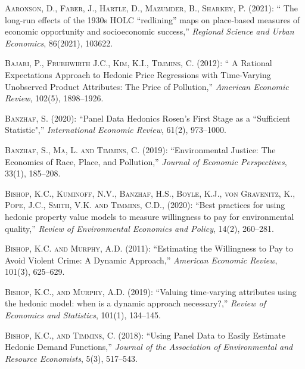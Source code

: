 \documentclass[ecta,nameyear,draft]{econsocart}
\theoremstyle{plain}
\theoremstyle{remark}
\begin{document}
\begin{thebibliography}{}

\textsc{Aaronson, D., Faber, J., Hartle, D., Mazumder, B., Sharkey, P.} (2021):
`` The long-run effects of the 1930s HOLC “redlining” maps on place-based
measures of economic opportunity and socioeconomic success,''
\textit{Regional Science and Urban Economics}, 86(2021), 103622.
\endbibitem

\textsc{Bajari, P., Fruehwirth J.C., Kim, K.I., Timmins, C.} (2012):
`` A Rational Expectations Approach to Hedonic Price Regressions with Time-Varying Unobserved Product Attributes: The Price of Pollution,''
\textit{American Economic Review}, 102(5), 1898--1926.
\endbibitem

\textsc{Banzhaf, S.} (2020):
``Panel Data Hedonics Rosen’s First Stage as a “Sufficient
Statistic",''
\textit{International Economic Review}, 61(2), 973--1000.
\endbibitem


\textsc{Banzhaf, S., Ma, L. and Timmins, C.} (2019):
``Environmental Justice: The Economics of Race, Place, and Pollution,''
\textit{Journal of Economic Perspectives}, 33(1), 185--208.
\endbibitem

\textsc{Bishop, K.C., Kuminoff, N.V., Banzhaf, H.S., Boyle, K.J., von Gravenitz, K., Pope, J.C., Smith, V.K. and Timmins, C.D., } (2020):
``Best practices for using hedonic property value models to measure willingness to pay for environmental quality,''
\textit{Review of Environmental Economics and Policy}, 14(2), 260--281.
\endbibitem

\textsc{Bishop, K.C. and Murphy, A.D.} (2011):
``Estimating the Willingness to Pay to Avoid Violent Crime: A Dynamic Approach,''
\textit{American Economic Review}, 101(3), 625--629.
\endbibitem

\textsc{Bishop, K.C., and Murphy, A.D.} (2019):
``Valuing time-varying attributes using the hedonic model: when is a dynamic approach necessary?,''
\textit{Review of Economics and Statistics}, 101(1), 134--145.
\endbibitem

\textsc{Bishop, K.C., and Timmins, C.} (2018):
``Using Panel Data to Easily Estimate Hedonic Demand Functions,''
\textit{Journal of the Association of Environmental and Resource Economists}, 5(3), 517--543.
\endbibitem


\end{thebibliography}
\end{document}
